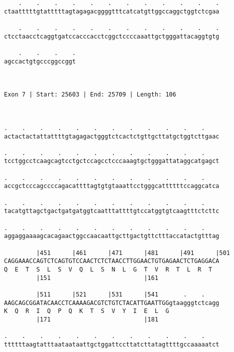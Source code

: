 \documentclass{article}
\begin{document}
\begin{Verbatim}
    .    .    .    .    .    .    .    .    .    .    .    .
ctaatttttgtatttttagtagagacggggtttcatcatgttggccaggctggtctcgaa
                                                            
    .    .    .    .    .    .    .    .    .    .    .    .
ctcctaacctcaggtgatccacccacctcggctccccaaattgctgggattacaggtgtg
                                                            
    .    .    .    .
agccactgtgcccggccggt
                    
                    
 
Exon 7 | Start: 25603 | End: 25709 | Length: 106



.    .    .    .    .    .    .    .    .    .    .    .    
actactactattattttgtagagactgggtctcactctgttgcttatgctggtcttgaac
                                                            
.    .    .    .    .    .    .    .    .    .    .    .    
tcctggcctcaagcagtcctgctccagcctcccaaagtgctgggattataggcatgagct
                                                            
.    .    .    .    .    .    .    .    .    .    .    .    
accgctcccagccccagacattttagtgtgtaaattcctgggcattttttccaggcatca
                                                            
.    .    .    .    .    .    .    .    .    .    .    .    
tacatgttagctgactgatgatggtcaatttattttgtccatggtgtcaagtttctcttc
                                                            
.    .    .    .    .    .    .    .    .    .    .    .    
aggaggaaaagcacagaactggccaacaattgcttgactgttctttaccatactgtttag
                                                            
         |451      |461      |471      |481      |491      |501
CAGGAAACCAGTCTCAGTGTCCAACTCTCTAACCTTGGAACTGTGAGAACTCTGAGGACA
Q  E  T  S  L  S  V  Q  L  S  N  L  G  T  V  R  T  L  R  T  
         |151                          |161                 
  
         |511      |521      |531      |541       .    .    
AAGCAGCGGATACAACCTCAAAAGACGTCTGTCTACATTGAATTGGgtaagggtctcagg
K  Q  R  I  Q  P  Q  K  T  S  V  Y  I  E  L  G              
         |171                          |181                 
  
.    .    .    .    .    .    .    .    .    .    .    .    
ttttttaagtatttaataataattgctggattccttatcttatagttttgccaaaaatct
                                                            

\end{Verbatim}
\end{document}
